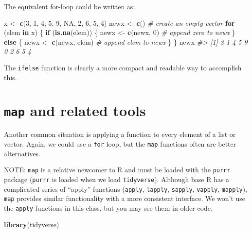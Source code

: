 \documentclass[]{book}
\newenvironment{Shaded}{\begin{snugshade}}{\end{snugshade}}
\newcommand{\CommentTok}[1]{\textcolor[rgb]{0.56,0.35,0.01}{\textit{#1}}}
\newcommand{\ControlFlowTok}[1]{\textcolor[rgb]{0.13,0.29,0.53}{\textbf{#1}}}
\newcommand{\DecValTok}[1]{\textcolor[rgb]{0.00,0.00,0.81}{#1}}
\newcommand{\KeywordTok}[1]{\textcolor[rgb]{0.13,0.29,0.53}{\textbf{#1}}}
\newcommand{\NormalTok}[1]{#1}
\newcommand{\OtherTok}[1]{\textcolor[rgb]{0.56,0.35,0.01}{#1}}
\newcommand{\StringTok}[1]{\textcolor[rgb]{0.31,0.60,0.02}{#1}}
\theoremstyle{definition}
\theoremstyle{definition}
\theoremstyle{definition}
\theoremstyle{remark}
\begin{document}
The equivalent for-loop could be written as:

\begin{Shaded}
\begin{Highlighting}[]
\NormalTok{x <-}\StringTok{ }\KeywordTok{c}\NormalTok{(}\DecValTok{3}\NormalTok{, }\DecValTok{1}\NormalTok{, }\DecValTok{4}\NormalTok{, }\DecValTok{5}\NormalTok{, }\DecValTok{9}\NormalTok{, }\OtherTok{NA}\NormalTok{, }\DecValTok{2}\NormalTok{, }\DecValTok{6}\NormalTok{, }\DecValTok{5}\NormalTok{, }\DecValTok{4}\NormalTok{)}
\NormalTok{newx <-}\StringTok{ }\KeywordTok{c}\NormalTok{()  }\CommentTok{# create an empty vector}
\ControlFlowTok{for}\NormalTok{ (elem }\ControlFlowTok{in}\NormalTok{ x) \{}
  \ControlFlowTok{if}\NormalTok{ (}\KeywordTok{is.na}\NormalTok{(elem)) \{}
\NormalTok{    newx <-}\StringTok{ }\KeywordTok{c}\NormalTok{(newx, }\DecValTok{0}\NormalTok{)  }\CommentTok{# append zero to newx}
\NormalTok{  \} }\ControlFlowTok{else}\NormalTok{ \{}
\NormalTok{    newx <-}\StringTok{ }\KeywordTok{c}\NormalTok{(newx, elem)  }\CommentTok{# append elem to newx}
\NormalTok{  \}}
\NormalTok{\}}
\NormalTok{newx}
\CommentTok{#>  [1] 3 1 4 5 9 0 2 6 5 4}
\end{Highlighting}
\end{Shaded}

The \texttt{ifelse} function is clearly a more compact and readable way
to accomplish this.

\hypertarget{map-and-related-tools}{%
\section{\texorpdfstring{\texttt{map} and related
tools}{map and related tools}}\label{map-and-related-tools}}

Another common situation is applying a function to every element of a
list or vector. Again, we could use a \texttt{for} loop, but the
\texttt{map} functions often are better alternatives.

NOTE: \texttt{map} is a relative newcomer to R and must be loaded with
the \texttt{purrr} package (\texttt{purrr} is loaded when we load
\texttt{tidyverse}). Although base R has a complicated series of
``apply'' functions (\texttt{apply}, \texttt{lapply}, \texttt{sapply},
\texttt{vapply}, \texttt{mapply}), \texttt{map} provides similar
functionality with a more consistent interface. We won't use the
\texttt{apply} functions in this class, but you may see them in older
code.

\begin{Shaded}
\begin{Highlighting}[]
\KeywordTok{library}\NormalTok{(tidyverse)}
\end{Highlighting}
\end{Shaded}
\end{document}
